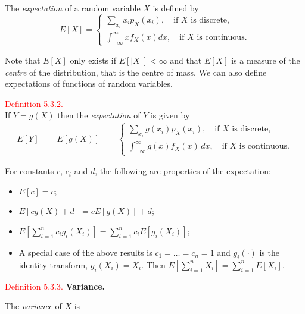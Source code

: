 \documentclass[
]{book}
\providecommand{\tightlist}{%
  \setlength{\itemsep}{0pt}\setlength{\parskip}{0pt}}
\begin{document}
The \emph{expectation} of a random variable \(X\) is defined by\\

\[E[X] = \begin{cases}
\sum\limits_{x_i} x_i p_X(x_i), \quad \text{if $X$ is discrete,} \\[9pt]
\int_{-\infty}^\infty x f_X(x)dx, \quad \text{if $X$ is continuous.}
\end{cases}\]

Note that \(E[X]\) only exists if \(E[|X|]<\infty\) and that \(E[X]\) is a measure of the \emph{centre} of the distribution, that is the centre of mass. We can also define expectations of functions of random variables.

\hypertarget{rv:def:expect2}{}
\textcolor{red}{Definition 5.3.2.}\\
If \(Y=g(X)\) then the \emph{expectation} of \(Y\) is given by\\

\begin{align*}
E[Y] &= E[g(X)] 
&= \begin{cases}
\sum\limits_{x_i} g(x_i) p_X(x_i), \quad \text{if $X$ is discrete,} \\[9pt]
\int_{-\infty}^\infty g(x) f_X(x) \,dx, \quad \text{if $X$ is continuous.}
\end{cases}
\end{align*}

For constants \(c\), \(c_i\) and \(d\), the following are properties of the expectation:

\begin{itemize}
\tightlist
\item
  \(E[c]=c\);\\
\item
  \(E[c g(X) + d]= c E[g(X)] + d\);\\
\item
  \(E \left[ \sum\limits_{i=1}^n c_i g_i(X_i) \right] = \sum\limits_{i=1}^n c_i E[g_i(X_i)]\);\\
\item
  A special case of the above results is \(c_1 = \ldots =c_n =1\) and \(g_i (\cdot)\) is the identity transform, \(g_i (X_i) =X_i\). Then \(E \left[ \sum\limits_{i=1}^n X_i \right] = \sum\limits_{i=1}^n E \left[ X_i \right]\).
\end{itemize}

\leavevmode{}%
\textcolor{red}{Definition 5.3.3.}
{\textbf{Variance.}}

The \emph{variance} of \(X\) is
\end{document}
